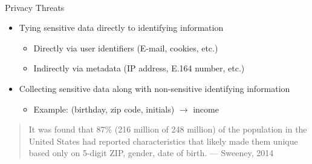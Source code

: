 \documentclass[helvetica]{beamer}
\begin{document}
\begin{frame}{Privacy Threats}

  \begin{itemize}
  \item Tying sensitive data directly to identifying information
    \begin{itemize}
    \item Directly via user identifiers (E-mail, cookies, etc.)
    \item Indirectly via metadata (IP address, E.164 number, etc.)
    \end{itemize}

  \item Collecting sensitive data along with non-sensitive identifying information
    \begin{itemize}
    \item Example: (birthday, zip code, initials) $\rightarrow$ income
      \end{itemize}
  \end{itemize}

  \vspace{1ex}
  \begin{quote}
    It was found that 87\% (216 million of 248 million) of the
    population in the United States had reported characteristics that
    likely made them unique based only on {5-digit ZIP, gender, date of
      birth}. --- Sweeney, 2014~\cite{sweeney2000simple}
    \end{quote}
    
\end{frame}
\end{document}
